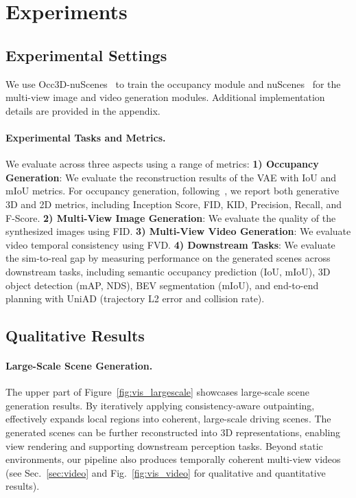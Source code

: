 \section{Experiments}

\subsection{Experimental Settings}
We use Occ3D-nuScenes~\cite{Occ3D} to train the occupancy module and nuScenes~\cite{nuScenes} for the multi-view image and video generation modules. Additional implementation details are provided in the appendix.

\paragraph{Experimental Tasks and Metrics.}
We evaluate {\method} across three aspects using a range of metrics:
\textbf{1) Occupancy Generation}: We evaluate the reconstruction results of the VAE with IoU and mIoU metrics. For occupancy generation, following~\cite{DynamicCity}, we report both generative 3D and 2D metrics, including Inception Score, FID, KID, Precision, Recall, and F-Score.
\textbf{2) Multi-View Image Generation}: We evaluate the quality of the synthesized images using FID.
\textbf{3) Multi-View Video Generation}: We evaluate video temporal consistency using FVD.
\textbf{4) Downstream Tasks}: We evaluate the sim-to-real gap by measuring performance on the generated scenes across downstream tasks, including semantic occupancy prediction (IoU, mIoU), 3D object detection (mAP, NDS), BEV segmentation (mIoU), and end-to-end planning with UniAD (trajectory L2 error and collision rate).

\subsection{Qualitative Results}
\paragraph{Large-Scale Scene Generation.}
The upper part of Figure~\ref{fig:vis_largescale} showcases large-scale scene generation results. By iteratively applying consistency-aware outpainting, {\method} effectively expands local regions into coherent, large-scale driving scenes. The generated scenes can be further reconstructed into 3D representations, enabling view rendering and supporting downstream perception tasks. Beyond static environments, our pipeline also produces temporally coherent multi-view videos (see Sec.~\ref{sec:video} and Fig.~\ref{fig:vis_video} for qualitative and quantitative results).

